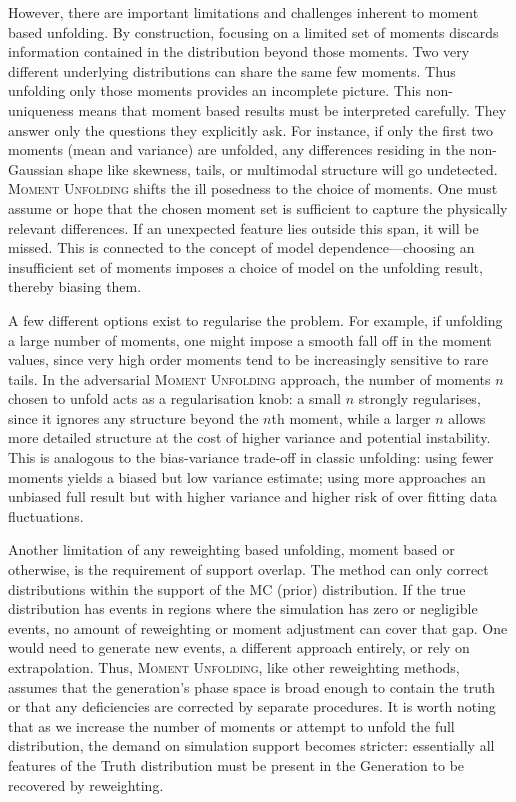 {{        However, there are important limitations and challenges inherent to moment based unfolding.
        By construction, focusing on a limited set of moments discards information contained in the distribution beyond those moments.
        Two very different underlying distributions can share the same few moments.
        Thus unfolding only those moments provides an incomplete picture.
        This non-uniqueness means that moment based results must be interpreted carefully.
        They answer only the questions they explicitly ask.
        For instance, if only the first two moments (mean and variance) are unfolded, any differences residing in the non-Gaussian shape like skewness, tails, or multimodal structure will go undetected.
        \textsc{Moment Unfolding} shifts the ill posedness to the choice of moments.
        One must assume or hope that the chosen moment set is sufficient to capture the physically relevant differences.
        If an unexpected feature lies outside this span, it will be missed.
        This is connected to the concept of model dependence---choosing an insufficient set of moments imposes a choice of model on the unfolding result, thereby biasing them.

        A few different options exist to regularise the problem.
        For example, if unfolding a large number of moments, one might impose a smooth fall off in the moment values, since very high order moments tend to be increasingly sensitive to rare tails.
        In the adversarial \textsc{Moment Unfolding} approach, the number of moments $n$ chosen to unfold acts as a regularisation knob: a small $n$ strongly regularises, since it ignores any structure beyond the $n$th moment, while a larger $n$ allows more detailed structure at the cost of higher variance and potential instability.
        This is analogous to the bias-variance trade-off in classic unfolding: using fewer moments yields a biased but low variance estimate; using more approaches an unbiased full result but with higher variance and higher risk of over fitting data fluctuations.
        
        Another limitation of any reweighting based unfolding, moment based or otherwise, is the requirement of support overlap.
        The method can only correct distributions within the support of the MC (prior) distribution.
        If the true distribution has events in regions where the simulation has zero or negligible events, no amount of reweighting or moment adjustment can cover that gap.
        One would need to generate new events, a different approach entirely, or rely on extrapolation.
        Thus, \textsc{Moment Unfolding}, like other reweighting methods, assumes that the generation's phase space is broad enough to contain the truth or that any deficiencies are corrected by separate procedures.
        It is worth noting that as we increase the number of moments or attempt to unfold the full distribution, the demand on simulation support becomes stricter: essentially all features of the Truth distribution must be present in the Generation to be recovered by reweighting.
}}

